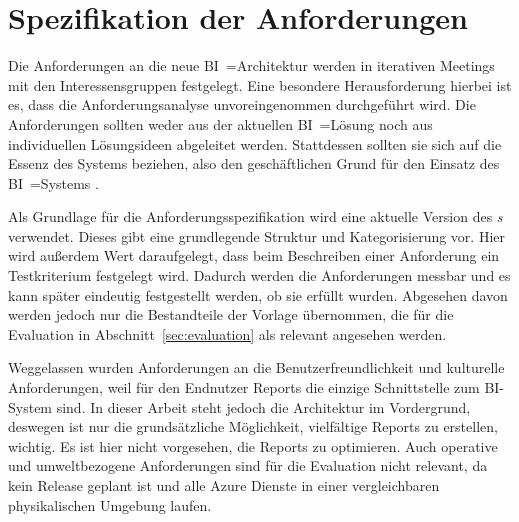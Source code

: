 \section{Spezifikation der Anforderungen}
Die Anforderungen an die neue BI~=Architektur werden in iterativen Meetings mit den Interessensgruppen festgelegt. Eine besondere Herausfor\-der\-ung hierbei ist es, dass die Anforderungsanalyse unvoreingenommen durchgeführt wird. Die Anforderungen sollten weder aus der aktuellen BI~=Lösung noch aus individuellen Lösungsideen abgeleitet werden. Stattdessen sollten sie sich auf die Essenz des Systems beziehen, also den geschäftlichen Grund für den Einsatz des BI~=Systems \cite[vgl.][]{robertson_mastering_2013}.

Als Grundlage für die Anforderungsspezifikation wird eine aktuelle Version des \textit{s} \cite{robertson_volere_2020} verwendet. Dieses gibt eine grundlegende Struktur und Kategorisierung vor. Hier wird außerdem Wert daraufgelegt, dass beim Beschreiben einer Anforderung ein Testkriterium festgelegt wird. Dadurch werden die Anforderungen messbar und es kann später eindeutig festgestellt werden, ob sie erfüllt wurden. Abgesehen davon werden jedoch nur die Bestandteile der Vorlage übernommen, die für die Evaluation in Abschnitt~\ref{sec:evaluation} als relevant angesehen werden.

Weggelassen wurden Anforderungen an die Benutzerfreundlichkeit und kulturelle Anforderungen, weil für den Endnutzer Reports die einzige Schnittstelle zum BI-System sind. In dieser Arbeit steht jedoch die Architektur im Vordergrund, deswegen ist nur die grundsätzliche Möglichkeit, vielfältige Reports zu erstellen, wichtig. Es ist hier nicht vorgesehen, die Reports zu optimieren. Auch operative und umweltbezogene Anforderungen sind für die Evaluation nicht relevant, da kein Release geplant ist und alle Azure Dienste in einer vergleichbaren physikalischen Umgebung laufen.